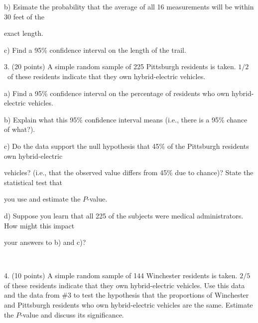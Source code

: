 \documentclass[10pt]{article}
\newcommand{\HH}{\hspace{10pt}\hphantom{a) } }
\begin{document}
\hspace{10pt} b) Esimate the probability that the average of all 16 measurements
will be within 30 feet of the\vspace{-4pt}

\HH exact length.
\vspace{1.2in}

\hspace{10pt} c) Find a 95\% confidence interval on the length  of the trail.

\vfill
\eject


3. (20 points)
A simple random sample of 225 Pittsburgh residents is taken.  
$1/2$~of these residents indicate that they own hybrid-electric vehicles.

\hspace{10pt} a) Find a 95\% confidence interval on the percentage of residents
who own hybrid-electric vehicles.
\vspace{1.5in}

\hspace{10pt} b) Explain what this 95\% confidence interval means (i.e., there is
a 95\% chance of what?).
\vspace{1.5in}


\hspace{10pt} c) Do the data support the null hypothesis that
45\% of the
  Pittsburgh residents own hybrid-electric\vspace{-4pt}

  \HH  vehicles? (i.e., that the observed value differs from 45\% due to chance)?
State the statistical test that\vspace{-4pt}

\HH you use and estimate the $P$-value.
\vspace{2.5in}


\hspace{10pt} d) Suppose you learn that all 225 of the subjects were 
medical administrators.  How might this impact \vspace{-4pt}

\HH your answers to b) and c)?
\vspace{-4pt}

\vfill
\eject
{\ }

4. (10 points) A simple random sample of 144 Winchester residents is taken.
$2/5$ of these residents indicate that they own hybrid-electric vehicles.
Use this data and the data from \#3 to 
test the hypothesis that the proportions of Winchester and Pittsburgh residents  who
own hybrid-electric vehicles are the same.
Estimate the $P$-value and discuss its significance.
\vspace{4in}
\end{document}
